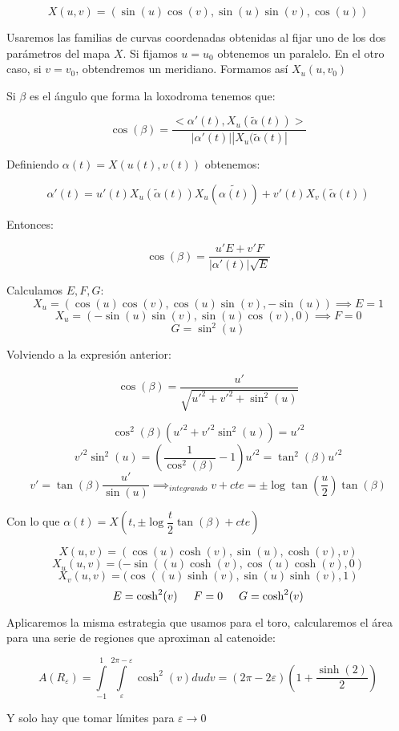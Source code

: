 \documentclass[openany]{book}
\begin{document}
\begin{exercise}
    $$ X(u,v) = (\sin(u) \cos(v), \sin(u) \sin(v), \cos(u)) $$

    Usaremos las familias de curvas coordenadas obtenidas al fijar uno de los dos parámetros del mapa $ X $. Si fijamos $ u=u_0 $ obtenemos un paralelo. En el otro caso, si $ v = v_0 $, obtendremos un meridiano. Formamos así $ X_{u}(u,v_0) $

    Si $ \beta $ es el ángulo que forma la loxodroma tenemos que:

    $$ \cos(\beta) = \dfrac{<\alpha '(t),X_{u}(\widetilde{\alpha} (t))>}{|\alpha ' (t)||X_{u}(\widetilde{\alpha} (t)|} $$

    Definiendo $ \alpha (t) = X(u(t),v(t)) $ obtenemos:

    $$ \alpha'(t) = u'(t)X_{u}(\widetilde{\alpha}(t))X_{u}( \widetilde{\alpha (t)}) + v'(t)X_{v}(\widetilde{\alpha}(t)) $$

    Entonces:

    $$ \cos(\beta) = \dfrac{u'E+v'F}{|\alpha ' (t)|\sqrt{E}} $$

    Calculamos $ E,F,G $:
    $$ X_{u} = (\cos(u) \cos(v), \cos(u) \sin(v),-\sin(u)) \implies E = 1 $$
    $$ X_{u} = (-\sin(u) \sin(v), \sin(u) \cos(v),0) \implies F = 0 $$
    $$ G = \sin^2(u) $$

    Volviendo a la expresión anterior:

    $$ \cos(\beta) = \dfrac{u'}{\sqrt{u'^2+v'^2+\sin^2(u)}} $$

    $$ \cos^2(\beta) (u'^2+v'^2 \sin^2(u))=u'^2  $$
    $$ v'^2 \sin^2(u) = \left( \dfrac{1}{\cos^2(\beta)} -1\right)u'^2 = \tan^2(\beta )u'^2 $$
    $$ v' = \tan(\beta) \dfrac{u'}{\sin(u)} \implies_{integrando} v+cte = \pm \log{\tan\left(\dfrac{u}{2}\right)} \tan(\beta ) $$

    Con lo que $ \alpha (t) = X\left(t,\pm\log{\dfrac{t}{2}}\tan(\beta )+cte\right) $

\end{exercise}

\begin{exercise}
    $$ X(u,v) = (\cos(u)\cosh(v), \sin(u),\cosh(v),v) $$
    $$ X_{u}(u,v) = (-\sin((u)\cosh(v), \cos(u)\cosh(v),0) $$
    $$ X_{v}(u,v) = (\cos((u)\sinh(v), \sin(u)\sinh(v),1) $$
    $$ E = \cosh^2(v)\hspace{5mm}F = 0 \hspace{5mm}G = \cosh ^2 (v) $$

    Aplicaremos la misma estrategia que usamos para el toro, calcularemos el área para una serie de regiones que aproximan al catenoide:

    $$ A(R_{\varepsilon}) = \int\limits_{-1}^{1}\int\limits_{\varepsilon}^{2 \pi - \varepsilon} \cosh ^2(v)dudv= (2 \pi-2 \varepsilon) \left( 1 + \dfrac{\sinh(2)}{2} \right)$$
    
    Y solo hay que tomar límites para $ \varepsilon \to 0 $
\end{exercise}
\end{document}
